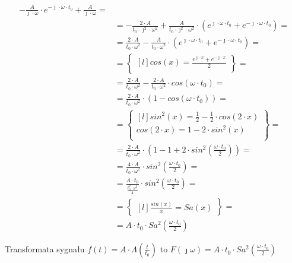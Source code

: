 \begin{task}
\begin{align*}
- \frac{A}{\jmath \cdot \omega} \cdot e^{ -\jmath \cdot \omega \cdot t_{0}} + \frac{A}{\jmath \cdot \omega}=\\
&=- \frac{2 \cdot A}{t_{0} \cdot \jmath^{2} \cdot \omega^{2}} + \frac{A}{t_{0} \cdot \jmath^{2} \cdot \omega^{2}}  \cdot \left(e^{ \jmath \cdot \omega \cdot t_{0}}+e^{ -\jmath \cdot \omega \cdot t_{0}} \right)=\\ %
&= \frac{2 \cdot A}{t_{0} \cdot \omega^{2}} - \frac{A}{t_{0} \cdot \omega^{2}} \cdot \left(e^{ \jmath \cdot \omega \cdot t_{0}}+e^{ -\jmath \cdot \omega \cdot t_{0}} \right)=\\%
&=\begin{Bmatrix*}[l]%
cos(x)=\frac{e^{\jmath \cdot x} + e^{-\jmath \cdot x}}{2}\\
\end{Bmatrix*}=\\
&= \frac{2 \cdot A}{t_{0} \cdot \omega^{2}} - \frac{2 \cdot A}{t_{0} \cdot \omega^{2}} \cdot cos(\omega \cdot t_{0})=\\%
&= \frac{2 \cdot A}{t_{0} \cdot \omega^{2}} \cdot (1 - cos(\omega \cdot t_{0}))=\\%
&=\begin{Bmatrix*}[l]%
sin^{2}(x)=\frac{1}{2}-\frac{1}{2}\cdot cos(2 \cdot x)\\
cos(2 \cdot x)= 1-2\cdot sin^{2}(x)\\
\end{Bmatrix*}=\\
&= \frac{2 \cdot A}{t_{0} \cdot \omega^{2}} \cdot (1 - 1 + 2\cdot sin^{2}(\frac{\omega \cdot t_{0}}{2}))=\\%
&= \frac{4 \cdot A}{t_{0} \cdot \omega^{2}} \cdot sin^{2}(\frac{\omega \cdot t_{0}}{2})=\\%
&= \frac{A \cdot t_{0}}{\frac{t_{0}^{2} \cdot \omega^{2}}{4}} \cdot sin^{2}(\frac{\omega \cdot t_{0}}{2})=\\%
&=\begin{Bmatrix*}[l]%
\frac{sin(x)}{x}=Sa(x)
\end{Bmatrix*}=\\
&= A \cdot t_{0} \cdot Sa^{2}(\frac{\omega \cdot t_{0}}{2})%
\end{align*}

Transformata sygnału $f(t) = A \cdot \Lambda(\frac{t}{t_{0}})$ to $F(\jmath \omega)=A \cdot t_{0} \cdot Sa^{2}(\frac{\omega \cdot t_{0}}{2})$

\end{task}
